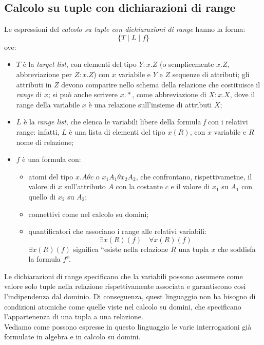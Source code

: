 \documentclass[12pt]{report}
\begin{document}
 	\subsection{Calcolo su tuple con dichiarazioni di range}
 	Le espressioni del \textit{calcolo su tuple con dichiarazioni di range} hanno la forma:
 	\[
 	\{T \mid L \mid f\}
 	\]
 	ove:
 	\begin{itemize}
 		\item $T$ è la \textit{target list}, con elementi del tipo $Y: x.Z$ (o semplicemente $x.Z$, abbreviazione per $Z: x.Z$) con $x$ variabile e $Y$ e $Z$ sequenze di attributi; gli attributi in $Z$ devono comparire nello schema della relazione che costituisce il \textit{range} di $x$; si può anche scrivere $x.*$, come abbreviazione di $X: x.X$, dove il range della variabile $x$ è una relazione sull'insieme di attributi $X$;
 		\item $L$ è la \textit{range list}, che elenca le variabili libere della formula \textit{f} con i relativi range: infatti, $L$ è una lista di elementi del tipo $x(R)$, con $x$ variabile e $R$ nome di relazione;
 		\item $f$ è una formula con:
 		\begin{itemize}
 			\item atomi del tipo $x.A\theta c$ o $x_1A_1\theta x_2A_2$, che confrontano, rispettivametne, il valore di $x$ sull'attributo $A$ con la costante $c$ e il valore di $x_1$ su $A_1$ con quello di $x_2$ su $A_2$;
 			\item connettivi come nel calcolo su domini;
 			\item quantificatori che associano i range alle relativi variabili:
 			\[
 			\exists x(R)(f) \quad \forall x(R)(f)
 			\]
 			$\exists x(R)(f)$ significa ``esiste nella relazione $R$ una tupla $x$ che soddisfa la formula $f$''. \\
 		\end{itemize}
 	\end{itemize}
 	Le dichiarazioni di range specificano che la variabili possono assumere come valore solo tuple nella relazione rispettivamente associata e garantiscono così l'indipendenza dal dominio. Di conseguenza, quest linguaggio non ha bisogno di condizioni atomiche come quelle viste nel calcolo su domini, che specificano l'appartenenza di una tupla a una relazione. \\
 	Vediamo come possono espresse in questo linguaggio le varie interrogazioni già formulate in algebra e in calcolo su domini. \\
\end{document}
